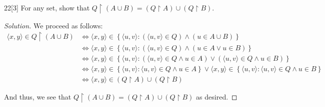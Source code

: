 \documentclass{article}
\newenvironment{solution}{\begin{proof}[Solution]}{\end{proof}}
\newcommand{\brc}[1]{ \left\{  {#1} \right\}}
\newcommand{\ang}[1]{\langle {#1} \rangle}
\begin{document}
	\begin{hw}{22}[3]
		For any set, show that $Q \restriction(A \cup B) = (Q \restriction A) \cup (Q \restriction B)$.
	\end{hw}
	\begin{solution}
		We proceed as follows:
		\begin{align*}
			\ang{x,y} \in Q \restriction (A \cup B) &\iff \ang{x,y} \in \brc{\ang{u,v} : (\ang{u,v} \in Q) \land (u \in A \cup B)} \\
			&\iff \ang{x,y} \in \brc{\ang{u,v} : (\ang{u,v} \in Q) \land (u \in A \lor u \in B)} \\
			&\iff \ang{x,y} \in \brc{\ang{u,v} : (\ang{u,v} \in Q \land u \in A) \lor (\ang{u,v} \in Q \land u \in B)} \\
			&\iff \ang{x,y} \in \brc{\ang{u,v} : \ang{u,v} \in Q \land u \in A} \lor \ang{x,y} \in \brc{\ang{u,v} : \ang{u,v} \in Q \land u \in B} \\
			&\iff \ang{x,y} \in (Q \restriction A) \cup (Q \restriction B)
		\end{align*}
	
		And thus, we see that $Q \restriction (A \cup B) = (Q \restriction A) \cup (Q \restriction B)$ as desired.
	\end{solution}
\end{document}
